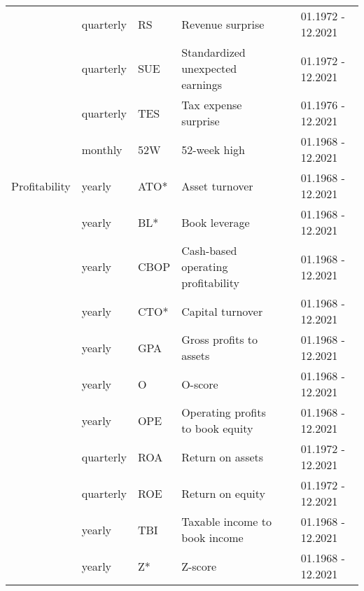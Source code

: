 \begin{landscape}
{\begin{ThreePartTable}
\begin{center}
\begin{footnotesize}
\begin{longtabu}{p{2.4cm} p{2cm} p{1.6cm} p{8.5cm} p{5.7cm} p{3.2cm}}
                        \rule{0pt}{1ex}
						  & quarterly & RS & Revenue surprise & \cite{je/li/2006} & 01.1972 - 12.2021  \\
                        \rule{0pt}{1ex}
						  & quarterly & SUE & Standardized unexpected earnings &  \cite{fo/ol/sh/1984} & 01.1972 - 12.2021  \\
                        \rule{0pt}{1ex}
						  & quarterly & TES & Tax expense surprise  & \cite{th/zh/2011} & 01.1976 - 12.2021   \\
                        \rule{0pt}{1ex}
						  & monthly & 52W & 52-week high & \cite{ge/hw/2004} & 01.1968 - 12.2021 \\
                        \hline 
                        \rule{0pt}{2ex}
						Profitability & yearly & ATO* & Asset turnover  & \cite{so/2008} & 01.1968 - 12.2021  \\
                        \rule{0pt}{1ex}
						  & yearly & BL* & Book leverage  & \cite{fa/fr/1992} & 01.1968 - 12.2021   \\
						\rule{0pt}{1ex}
						  & yearly & CBOP & Cash-based operating profitability & \cite{ba/ge/li/ni/2016} & 01.1968 - 12.2021 \\
                        \rule{0pt}{1ex}
						  & yearly & CTO* & Capital turnover  & \cite{ha/ba/1996} & 01.1968 - 12.2021  \\
                        \rule{0pt}{1ex}
						  & yearly & GPA & Gross profits to assets  & \cite{no/2013} & 01.1968 - 12.2021 \\
                        \rule{0pt}{1ex}
						  & yearly & O & \cite{oh/1980} O-score  & \cite{di/1998} & 01.1968 - 12.2021  \\
                        \rule{0pt}{1ex}
						  & yearly & OPE & Operating profits to book equity  & \cite{fa/fr/2015} & 01.1968 - 12.2021  \\
                        \rule{0pt}{1ex}
						  & quarterly & ROA & Return on assets  &  \cite{ba/ba/fa/2010} & 01.1972 - 12.2021   \\
                        \rule{0pt}{1ex}
						  & quarterly & ROE & Return on equity  & \cite{ho/xu/zh/15} & 01.1972 - 12.2021  \\
                        \rule{0pt}{1ex}
						  & yearly & TBI & Taxable income to book income  & \cite{le/ni/2004} & 01.1968 - 12.2021  \\         
                        \rule{0pt}{1ex}
						  & yearly & Z* & \cite{al/1968} Z-score & \cite{di/1998} & 01.1968 - 12.2021   \\     

\end{longtabu}
\end{footnotesize}
\end{center}
\end{ThreePartTable}}
\end{landscape}
